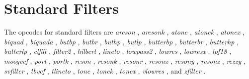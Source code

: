 \begin{comment}
\documentclass[10pt]{article}
\usepackage{fullpage, graphicx, url}
\setlength{\parskip}{1ex}
\setlength{\parindent}{0ex}
\title{Standard Filters}



\begin{tabular}{ccc}
The Alternative Csound Reference Manual & & \\
Previous &Signal Modifiers &Next

\end{tabular}

\end{comment}
\section{Standard Filters}


  The opcodes for standard filters are \emph{areson}
, \emph{aresonk}
, \emph{atone}
, \emph{atonek}
, \emph{atonex}
, \emph{biquad}
, \emph{biquada}
, \emph{butbp}
, \emph{butbr}
, \emph{buthp}
, \emph{butlp}
, \emph{butterbp}
, \emph{butterbr}
, \emph{butterhp}
, \emph{butterlp}
, \emph{clfilt}
, \emph{filter2}
, \emph{hilbert}
, \emph{lineto}
, \emph{lowpass2}
, \emph{lowres}
, \emph{lowresx}
, \emph{lpf18}
, \emph{moogvcf}
, \emph{port}
, \emph{portk}
, \emph{reson}
, \emph{resonk}
, \emph{resonr}
, \emph{resonx}
, \emph{resony}
, \emph{resonz}
, \emph{rezzy}
, \emph{svfilter}
, \emph{tbvcf}
, \emph{tlineto}
, \emph{tone}
, \emph{tonek}
, \emph{tonex}
, \emph{vlowres}
, and \emph{zfilter}
. 


\begin{comment}
\begin{tabular}{lcr}
Previous &Home &Next \\
Specialized Filters &Up &Waveguides

\end{tabular}



\end{comment}
